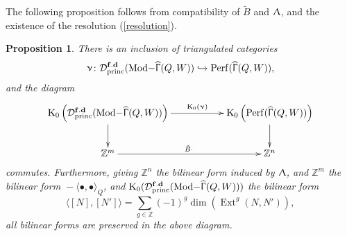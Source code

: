 \documentclass[a4paper,10pt]{amsart}
\newtheorem{proposition}[theorem]{Proposition}
\newcommand{\ZZ}{\mathbb{Z}}
\renewcommand{\Lambda}{\Uplambda}
\renewcommand{\Gamma}{\Upgamma}
\renewcommand{\nu}{\upnu}
\DeclareMathOperator{\KK}{K_0}
\DeclareMathOperator{\Ext}{Ext}
\DeclareMathOperator{\fd}{\mathbf{f.d}}
\DeclareMathOperator{\Tmod}{Mod-}
\newcommand{\Rmod}[1]{\Tmod\!#1}
\DeclareMathOperator{\Perf}{Perf}
\DeclareMathOperator{\HGamma}{\widehat{\Gamma}}
\DeclareMathOperator{\princ}{princ}
\newcommand{\Dub}{\mathcal{D}}
\begin{document}
The following proposition follows from compatibility of $\tilde{B}$ and $\Lambda$, and the existence of the resolution (\ref{resolution}).

\begin{proposition}\label{lattComm}
There is an inclusion of triangulated categories 
\[
\nu\colon\Dub_{\princ}^{\fd}(\Rmod{\HGamma(Q,W)})\hookrightarrow \Perf(\HGamma(Q,W)),
\]
and the diagram
\[
\xymatrix{
\KK\left(\Dub_{\princ}^{\fd}(\Rmod{\HGamma(Q,W)})\right)\ar[d]\ar[rr]^-{\KK(\nu)}&&\KK\left(\Perf(\HGamma(Q,W))\right)\ar[d]\\
\mathbb{Z}^{m}\ar[rr]^{ \tilde{B}\cdot}&&\mathbb{Z}^{n}
}
\]
commutes.  Furthermore, giving $\mathbb{Z}^n$ the bilinear form induced by $\Lambda$, and $\mathbb{Z}^m$ the bilinear form ${}-\langle\bullet ,\bullet\rangle_Q$, and $\KK(\Dub_{\princ}^{\fd}(\Rmod{\HGamma(Q,W)}))$ the bilinear form
\[
\langle [N],[N']\rangle=\sum_{g\in\ZZ}(-1)^g\dim\left(\Ext^g(N,N')\right),
\]
all bilinear forms are preserved in the above diagram.
\end{proposition}
\end{document}
